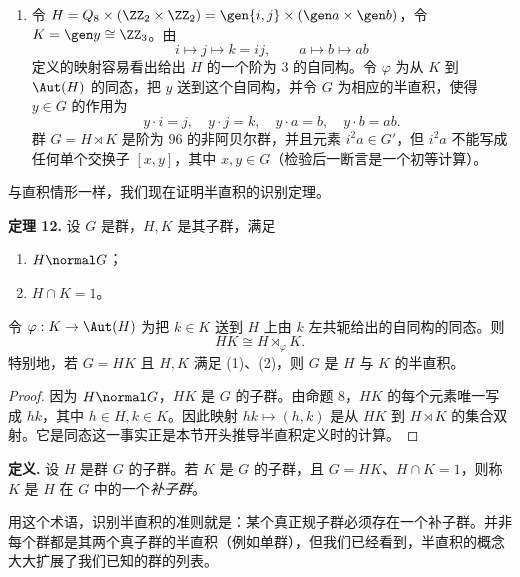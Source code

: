 \begin{enumerate}[label=(\arabic*)]
  接着令 $H=\ZZ_{p^2}$，令 $K=\ZZ_p$。再次由命题 4.17，$\Aut(H)\cong\ZZ_{p(p-1)}$，所以 $H$ 有阶为 $p$ 的自同构。因此存在从 $K$ 到 $\Aut(H)$ 的非平凡同态 $\varphi$，从而群 $H\rtimes K$ 是阶为 $p^3$ 的非阿贝尔群。更显式地，若 $H=\gen y$，且 $x$ 是 $K$ 的生成元，则令 $x$ 作用在 $y$ 上为
  \[
    x\cdot y=y^{1+p}.
  \]
  所得半直积有展示
  \[
    \gen{x,y\mid x^p=y^{p^2}=1,
    \ xyx^{-1}=y^{1+p}}.
  \]
  这两个群不同构：前者没有阶为 $p^2$ 的元素（参见练习 25），而后者显然有这样的元素，即 $y$。

  \item 令 $H=Q_8\times(\ZZ_2\times\ZZ_2)=\gen{i,j}\times(\gen a\times\gen b)$，令 $K=\gen y\cong\ZZ_3$。由
  \[
    i\mapsto j\mapsto k=ij,
    \qquad
    a\mapsto b\mapsto ab
  \]
  定义的映射容易看出给出 $H$ 的一个阶为 $3$ 的自同构。令 $\varphi$ 为从 $K$ 到 $\Aut(H)$ 的同态，把 $y$ 送到这个自同构，并令 $G$ 为相应的半直积，使得 $y\in G$ 的作用为
  \[
    y\cdot i=j,
    \quad
    y\cdot j=k,
    \quad
    y\cdot a=b,
    \quad
    y\cdot b=ab.
  \]
  群 $G=H\rtimes K$ 是阶为 $96$ 的非阿贝尔群，并且元素 $i^2a\in G'$，但 $i^2a$ 不能写成任何单个交换子 $[x,y]$，其中 $x,y\in G$（检验后一断言是一个初等计算）。
\end{enumerate}

与直积情形一样，我们现在证明半直积的识别定理。

\medskip
\noindent\textbf{定理 12.} 设 $G$ 是群，$H,K$ 是其子群，满足
\begin{enumerate}[label=(\arabic*)]
  \item $H\normal G$；
  \item $H\cap K=1$。
\end{enumerate}
令 $\varphi:K\to\Aut(H)$ 为把 $k\in K$ 送到 $H$ 上由 $k$ 左共轭给出的自同构的同态。则
\[
  HK\cong H\rtimes_\varphi K.
\]
特别地，若 $G=HK$ 且 $H,K$ 满足 (1)、(2)，则 $G$ 是 $H$ 与 $K$ 的半直积。

\begin{proof}
因为 $H\normal G$，$HK$ 是 $G$ 的子群。由命题 8，$HK$ 的每个元素唯一写成 $hk$，其中 $h\in H,k\in K$。因此映射 $hk\mapsto(h,k)$ 是从 $HK$ 到 $H\rtimes K$ 的集合双射。它是同态这一事实正是本节开头推导半直积定义时的计算。
\end{proof}

\noindent\textbf{定义.} 设 $H$ 是群 $G$ 的子群。若 $K$ 是 $G$ 的子群，且 $G=HK$、$H\cap K=1$，则称 $K$ 是 $H$ 在 $G$ 中的一个\emph{补子群}。

用这个术语，识别半直积的准则就是：某个真正规子群必须存在一个补子群。并非每个群都是其两个真子群的半直积（例如单群），但我们已经看到，半直积的概念大大扩展了我们已知的群的列表。

